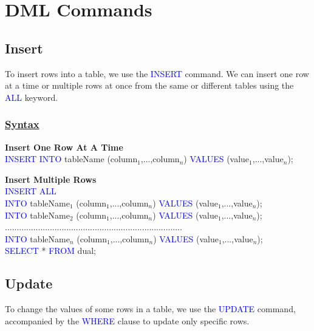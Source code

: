 
\section{DML Commands}

\subsection{Insert}

\begin{tcolorbox}
To insert rows into a table, we use the \textcolor{blue}{INSERT} command. We can insert one row at a time or multiple rows at once from the same or different tables using the \textcolor{blue}{ALL} keyword.
\end{tcolorbox}

\subsubsection*{\underline{\textbf{Syntax}}}
\begin{tcolorbox}[title = Insert]
\textbf{Insert One Row At A Time}\\
\textcolor{blue}{INSERT INTO} tableName (column$_{1}$,...,column$_{n}$) \textcolor{blue}{VALUES} (value$_{1}$,...,value$_{n}$);

\textbf{Insert Multiple Rows}\\
\textcolor{blue}{INSERT ALL}\\
\textcolor{blue}{INTO} tableName$_{1}$ (column$_{1}$,...,column$_{n}$) \textcolor{blue}{VALUES} (value$_{1}$,...,value$_{n}$);\\
\textcolor{blue}{INTO} tableName$_{2}$ (column$_{1}$,...,column$_{n}$) \textcolor{blue}{VALUES} (value$_{1}$,...,value$_{n}$);\\
...........................................................................\\
\textcolor{blue}{INTO} tableName$_{n}$ (column$_{1}$,...,column$_{n}$) \textcolor{blue}{VALUES} (value$_{1}$,...,value$_{n}$);\\
\textcolor{blue}{SELECT} * \textcolor{blue}{FROM} dual;
\end{tcolorbox}

\subsection{Update}
\begin{tcolorbox}[title = Definition]
To change the values of some rows in a table, we use the \textcolor{blue}{UPDATE} command, accompanied by the \textcolor{blue}{WHERE} clause to update only specific rows.
\end{tcolorbox}

